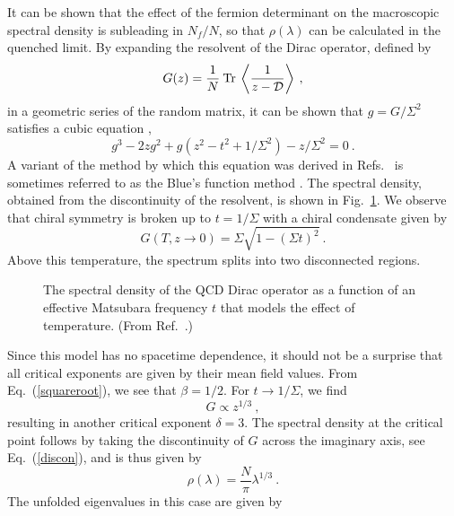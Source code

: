 It can be shown that the effect of the fermion determinant on the
macroscopic spectral density is subleading in $N_f/N$, so that
$\rho(\lambda)$ can be calculated in the quenched limit. By expanding the
resolvent of the Dirac operator, defined by
\begin{equation}
  G(z) = \frac 1N\:{\rm Tr\:} \left \langle  \frac 1{z-{\cal D}}
  \right\rangle\:,
\end{equation}
in a geometric series of the random matrix, it can be shown that
$g=G/\Sigma^2$ satisfies a cubic equation \cite{JV,senert,mishat},
\begin{equation}
  g^3 -2zg^2 +g(z^2-t^2 + 1/\Sigma^2) - z/\Sigma^2 = 0\:.
  \label{cubic}
\end{equation}
A variant of the method by which this equation was derived in
Refs.~\cite{JV,senert} is sometimes referred to as the Blue's function
method \cite{zeeblue}.  The spectral density, obtained from
the discontinuity of the resolvent, is shown in Fig.~\ref{mishaspants}.
We observe that chiral symmetry is broken up to $t = 1/\Sigma$ with a
chiral condensate given by
\begin{equation}
  \label{squareroot}
  G(T,z\rightarrow 0) = \Sigma\sqrt{1-(\Sigma t)^2}\:.
\end{equation}
Above this temperature, the spectrum splits into two disconnected
regions.
\begin{figure}
  \begin{center}
    \caption{The spectral density of the QCD Dirac operator as
      a function of an effective Matsubara frequency $t$ that models
      the effect of temperature.  (From Ref.~\cite{mishat}.)}
    \label{mishaspants}
  \end{center}
\end{figure}
Since this model has no spacetime dependence, it should
not be a surprise that all critical exponents are given by their
mean field values.  {}From Eq.~(\ref{squareroot}), we see that $\beta
=1/2$.  For $t\to1/\Sigma$, we find
\begin{equation}
  G \propto z^{1/3}\:,
\end{equation}
resulting in another critical exponent $\delta = 3$. The spectral
density at the critical point follows by taking the discontinuity of
$G$ across the imaginary axis, see Eq.~(\ref{discon}), and is thus
given by
\begin{equation}
  \rho(\lambda) = \frac{N}{\pi} \lambda^{1/3}\:.
\end{equation}
The unfolded eigenvalues in this case are given by

